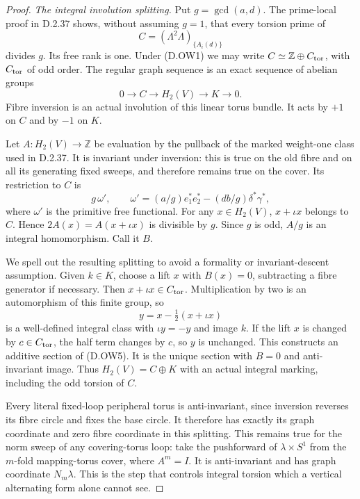 \begin{proof}
\emph{The integral involution splitting.}
Put $g=\gcd(a,d)$. The prime-local proof in D.2.37
shows, without assuming $g=1$, that every torsion
prime of
\[
 C=(\Lambda^2\Lambda)_{\{A_i(d)\}}
\]
divides $g$. Its free rank is one. Under (D.OW1)
we may write $C\simeq\mathbb Z\oplus C_{\rm tor}$,
with $C_{\rm tor}$ of odd order. The regular graph
sequence is an exact sequence of abelian groups
\[
                 0\longrightarrow C\longrightarrow
           H_2(V)\longrightarrow K\longrightarrow0.      \tag{D.OW5}
\]
Fibre inversion is an actual involution of this
linear torus bundle. It acts by $+1$ on $C$ and
by $-1$ on $K$.

Let $A:H_2(V)\to\mathbb Z$ be evaluation by the
pullback of the marked weight-one class used in
D.2.37. It is invariant under inversion: this is
true on the old fibre and on all its generating
fixed sweeps, and therefore remains true on the
cover. Its restriction to $C$ is
\[
 g\,\omega',\qquad
 \omega'=(a/g)e_1^*e_2^*-(db/g)\delta^*\gamma^*,
\]
where $\omega'$ is the primitive free functional.
For any $x\in H_2(V)$, $x+\iota x$ belongs to $C$.
Hence
$2A(x)=A(x+\iota x)$ is divisible by $g$.
Since $g$ is odd, $A/g$ is an integral homomorphism.
Call it $B$.

We spell out the resulting splitting to avoid a
formality or invariant-descent assumption. Given
$k\in K$, choose a lift $x$ with $B(x)=0$, subtracting
a fibre generator if necessary. Then
$x+\iota x\in C_{\rm tor}$. Multiplication by two
is an automorphism of this finite group, so
\[
                  y=x-\tfrac12(x+\iota x)                 \tag{D.OW6}
\]
is a well-defined integral class with
$\iota y=-y$ and image $k$. If the lift $x$ is
changed by $c\in C_{\rm tor}$, the half term
changes by $c$, so $y$ is unchanged.
This constructs an additive section of (D.OW5).
It is the unique section with $B=0$ and
anti-invariant image. Thus
$H_2(V)=C\oplus K$ with an actual integral marking,
including the odd torsion of $C$.

Every literal fixed-loop peripheral torus is
anti-invariant, since inversion reverses its
fibre circle and fixes the base circle. It
therefore has exactly its graph coordinate and
zero fibre coordinate in this splitting.
This remains true for the norm sweep of any
covering-torus loop: take the pushforward of
$\lambda\times S^1$ from the $m$-fold mapping-torus
cover, where $A^m=I$. It is anti-invariant and
has graph coordinate $N_m\lambda$.
This is the step that controls integral torsion
which a vertical alternating form alone cannot see.


\end{proof}
